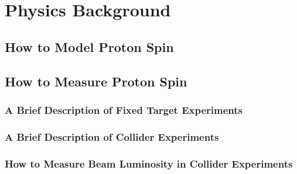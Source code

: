 \chapter{Physics Background}
\section{How to Model Proton Spin}
\section{How to Measure Proton Spin}
\subsection{A Brief Description of Fixed Target Experiments}
\subsection{A Brief Description of Collider Experiments}
\subsection{How to Measure Beam Luminosity in Collider Experiments}

